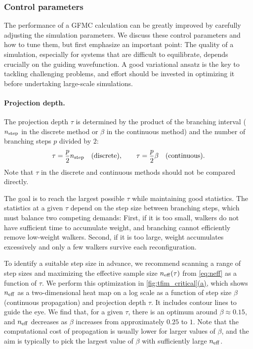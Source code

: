 \documentclass{SciPost}
\newcommand{\figref}[2]{\hyperref[#1]{\autoref*{#1}(#2)}}
\newcommand{\nbra}{n_{\rm step}}
\newcommand{\neff}{n_{\rm eff}}
\begin{document}
\subsubsection{Control parameters}\label{sec:gfmc:params}
The performance of a GFMC calculation can be greatly improved by carefully adjusting the simulation parameters.
%
We discuss these control parameters and how to tune them, but first emphasize an important point:
The quality of a simulation, especially for systems that are difficult to equilibrate, depends crucially on the guiding wavefunction.
%
A good variational ansatz is the key to tackling challenging problems, and effort should be invested in optimizing it before undertaking large-scale simulations.

\paragraph{Projection depth.}
The projection depth $\tau$ is determined by the product of the branching interval ($\nbra$ in the discrete method or $\beta$ in the continuous method) and the number of branching steps $p$ divided by $2$:
\begin{align}
	\tau = \frac{p}{2}\nbra \quad \text{(discrete)}, \qquad \tau = \frac{p}{2}\beta \quad \text{(continuous)}.
\end{align}
Note that $\tau$ in the discrete and continuous methods should not be compared directly.

The goal is to reach the largest possible $\tau$ while maintaining good statistics.
%
The statistics at a given $\tau$ depend on the step size between branching steps, which must balance two competing demands:
First, if it is too small, walkers do not have sufficient time to accumulate weight, and branching cannot efficiently remove low-weight walkers.
%
Second, if it is too large, weight accumulates excessively and only a few walkers survive each reconfiguration.

To identify a suitable step size in advance, we recommend scanning a range of step sizes and maximizing the effective sample size $\neff(\tau)$ from \autoref{eq:neff} as a function of $\tau$.
%
We perform this optimization in \figref{fig:tfim_critical}{a}, which shows $\neff$ as a two-dimensional heat map on a log scale as a function of step size $\beta$ (continuous propagation) and projection depth $\tau$.
%
It includes contour lines to guide the eye.
%
We find that, for a given $\tau$, there is an optimum around $\beta\approx 0.15$, and $\neff$ decreases as $\beta$ increases from approximately $0.25$ to $1$.
%
Note that the computational cost of propagation is usually lower for larger values of $\beta$, and the aim is typically to pick the largest value of $\beta$ with sufficiently large $\neff$.
\end{document}
